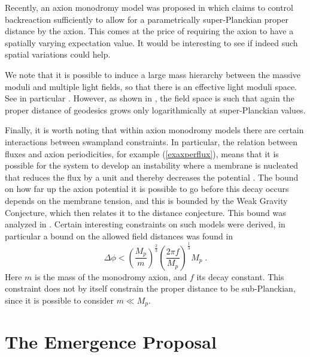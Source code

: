 \documentclass[11pt,a4paper]{article}
\numberwithin{equation}{section}
\numberwithin{table}{section}\setlength{\multlinegap}{25pt}
\newcommand{\be}{\begin{equation}}
\newcommand{\ee}{\end{equation}}
\begin{document}
{Recently, an axion monodromy model was proposed in \cite{Buratti:2018xjt} which claims to control backreaction sufficiently to allow for a parametrically super-Planckian proper distance by the axion. This comes at the price of requiring the axion to have a spatially varying expectation value. It would be interesting to see if indeed such spatial variations could help.

We note that it is possible to induce a large mass hierarchy between the massive moduli and multiple light fields, so that there is an effective light moduli space. See in particular \cite{Hebecker:2017lxm,Cicoli:2018tcq,Goswami:2018pvk}. However, as shown in \cite{Hebecker:2017lxm}, the field space is such that again the proper distance of geodesics grows only logarithmically at super-Planckian values. 

Finally, it is worth noting that within axion monodromy models there are certain interactions between swampland constraints. In particular, the relation between fluxes and axion periodicities, for example (\ref{exaxperflux}), means that it is possible for the system to develop an instability where a membrane is nucleated that reduces the flux by a unit and thereby decreases the potential \cite{Kaloper:2011jz}. The bound on how far up the axion potential it is possible to go before this decay occurs depends on the membrane tension, and this is bounded by the Weak Gravity Conjecture, which then relates it to the distance conjecture. This bound was analyzed in \cite{Kaloper:2011jz,Ibanez:2015fcv,Hebecker:2015zss,Brown:2016nqt}. Certain interesting constraints on such models were derived, in particular a bound on the allowed field distances was found in \cite{Hebecker:2015zss}
\be
\Delta \phi < \left(\frac{M_p}{m}\right)^{\frac23} \left( \frac{2 \pi f}{M_p}\right)^{\frac13} M_p\;.
\ee
Here $m$ is the mass of the monodromy axion, and $f$ its decay constant. This constraint does not by itself constrain the proper distance to be sub-Planckian, since it is possible to consider $m \ll M_p$. 


\section{The Emergence Proposal}
\label{sec:emergence}

}
\end{document}
